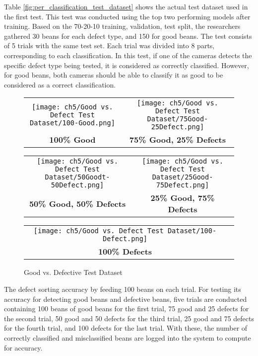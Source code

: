 Table \ref{fig:per_classification_test_dataset} shows the actual test dataset used in the first test. This test was conducted using the top two performing models after training. Based on the 70-20-10 training, validation, test split, the researchers gathered 30 beans for each defect type, and 150 for good beans. The test consists of 5 trials with the same test set. Each trial was divided into 8 parts, corresponding to each classification. In this test, if one of the cameras detects the specific defect type being tested, it is considered as correctly classified. However, for good beans, both cameras should be able to classify it as good to be considered as a correct classification.

\begin{figure}[H]
	\centering
	\begin{tabular}{cc}
		\texttt{[image: ch5/Good vs. Defect Test Dataset/100-Good.png]} &
		\texttt{[image: ch5/Good vs. Defect Test Dataset/75Good-25Defect.png]} \\
		\textbf{100\% Good}  & \textbf{75\% Good, 25\% Defects} \\[6pt]
	\end{tabular}
	\begin{tabular}{cc}
		\texttt{[image: ch5/Good vs. Defect Test Dataset/50Goodt-50Defect.png]} &
		\texttt{[image: ch5/Good vs. Defect Test Dataset/25Good-75Defect.png]} \\
		\textbf{50\% Good, 50\% Defects}  & \textbf{25\% Good, 75\% Defects} \\[6pt]
	\end{tabular}
	\begin{tabular}{cc}
		\texttt{[image: ch5/Good vs. Defect Test Dataset/100-Defect.png]} &
		\\
		\textbf{100\% Defects} & \\[6pt]
	\end{tabular}
	\caption{Good vs. Defective Test Dataset}
	\label{fig:good_vs_defective_test_dataset}
\end{figure}

The defect sorting accuracy by feeding 100 beans on each trial. For testing its accuracy for detecting good beans and defective beans, five trials are conducted containing 100 beans of good beans for the first trial, 75 good and 25 defects for the second trial, 50 good and 50 defects for the third trial, 25 good and 75 defects for the fourth trial, and 100 defects for the last trial. With these, the number of correctly classified and misclassified beans are logged into the system to compute for accuracy. 

